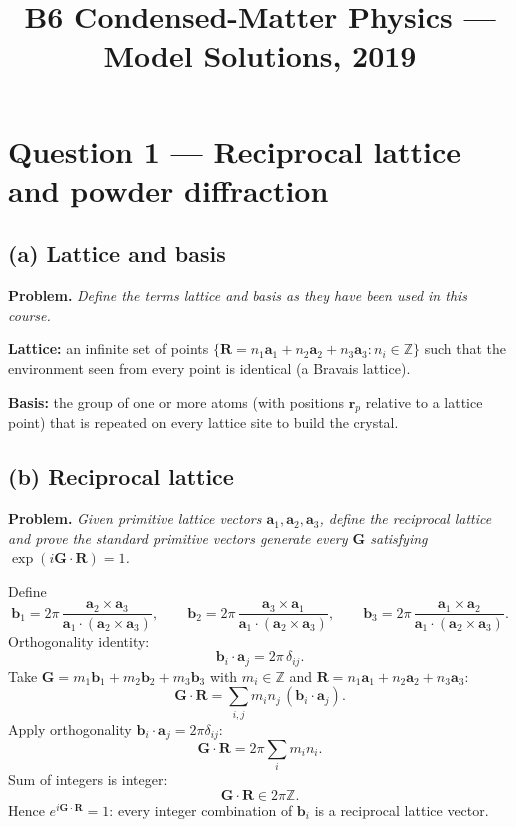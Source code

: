 \documentclass[11pt]{article}
\title{B6 Condensed-Matter Physics --- Model Solutions, 2019}
\author{}
\date{}
\begin{document}
\maketitle

\section*{Question 1 --- Reciprocal lattice and powder diffraction}

\subsection*{(a) Lattice and basis}

\textbf{Problem.} \emph{Define the terms lattice and basis as they have been used in this course.}

\textbf{Lattice:} an infinite set of points $\{\bm R = n_1\bm a_1 + n_2\bm a_2 + n_3\bm a_3 : n_i\in\mathbb Z\}$ such that the environment seen from every point is identical (a Bravais lattice).

\textbf{Basis:} the group of one or more atoms (with positions $\bm r_p$ relative to a lattice point) that is repeated on every lattice site to build the crystal.

\subsection*{(b) Reciprocal lattice}

\textbf{Problem.} \emph{Given primitive lattice vectors $\bm a_1, \bm a_2, \bm a_3$, define the reciprocal lattice and prove the standard primitive vectors generate every $\bm G$ satisfying $\exp(i\bm G\!\cdot\!\bm R)=1$.}

Define
\begin{equation}
\bm b_1 = 2\pi\,\frac{\bm a_2\times\bm a_3}{\bm a_1\cdot(\bm a_2\times\bm a_3)},\qquad
\bm b_2 = 2\pi\,\frac{\bm a_3\times\bm a_1}{\bm a_1\cdot(\bm a_2\times\bm a_3)},\qquad
\bm b_3 = 2\pi\,\frac{\bm a_1\times\bm a_2}{\bm a_1\cdot(\bm a_2\times\bm a_3)}.
\label{eq:bdef}
\end{equation}
Orthogonality identity:
\[
\bm b_i\cdot\bm a_j = 2\pi\,\delta_{ij}.
\]
Take $\bm G=m_1\bm b_1+m_2\bm b_2+m_3\bm b_3$ with $m_i\in\mathbb Z$ and $\bm R=n_1\bm a_1+n_2\bm a_2+n_3\bm a_3$:
\[
\bm G\cdot\bm R = \sum_{i,j} m_i n_j\,(\bm b_i \cdot \bm a_j).
\]
Apply orthogonality $\bm b_i\cdot\bm a_j=2\pi\delta_{ij}$:
\[
\bm G\cdot\bm R = 2\pi\sum_i m_i n_i.
\]
Sum of integers is integer:
\[
\bm G\cdot\bm R \in 2\pi\mathbb Z.
\]
Hence $e^{i\bm G\cdot\bm R}=1$: every integer combination of $\bm b_i$ is a reciprocal lattice vector.
\end{document}
